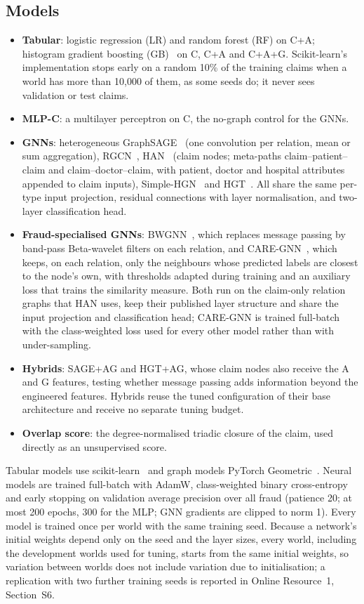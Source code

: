 \documentclass[pdflatex,sn-vancouver-num]{sn-jnl}
\newcommand{\SSecSeeds}{S6}\newcommand{\STabSeeds}{S5}
\begin{document}
\subsection{Models}\label{sec:models}
\begin{itemize}
\item \textbf{Tabular}: logistic regression (LR) and random forest (RF) on C+A;
  histogram gradient boosting (GB)~\cite{ke2017lightgbm} on C, C+A and C+A+G.
  Scikit-learn's implementation stops early on a random 10\% of the training
  claims when a world has more than 10{,}000 of them, as some seeds do; it
  never sees validation or test claims.
\item \textbf{MLP-C}: a multilayer perceptron on C, the no-graph control for the GNNs.
\item \textbf{GNNs}: heterogeneous GraphSAGE~\cite{hamilton2017sage} (one convolution
  per relation, mean or sum aggregation), RGCN~\cite{schlichtkrull2018}, HAN~\cite{wang2019han}
  (claim nodes; meta-paths claim--patient--claim and claim--doctor--claim, with
  patient, doctor and hospital attributes appended to claim inputs),
  Simple-HGN~\cite{lv2021} and HGT~\cite{hu2020hgt}. All share the same
  per-type input projection, residual connections with layer normalisation,
  and two-layer classification head.
\item \textbf{Fraud-specialised GNNs}: BWGNN~\cite{tang2022bwgnn}, which replaces
  message passing by band-pass Beta-wavelet filters on each relation, and
  CARE-GNN~\cite{dou2020care}, which keeps, on each relation, only the
  neighbours whose predicted labels are closest to the node's own, with
  thresholds adapted during training and an auxiliary loss that trains the
  similarity measure. Both run on the claim-only relation
  graphs that HAN uses, keep their published layer structure and share the
  input projection and classification head; CARE-GNN is trained full-batch
  with the class-weighted loss used for every other model rather than with
  under-sampling.
\item \textbf{Hybrids}: SAGE+AG and HGT+AG, whose claim nodes also receive the
  A and G features, testing whether message passing adds information beyond
  the engineered features. Hybrids reuse the tuned configuration of their base
  architecture and receive no separate tuning budget.
\item \textbf{Overlap score}: the degree-normalised triadic closure of the claim,
  used directly as an unsupervised score.
\end{itemize}
Tabular models use scikit-learn~\cite{pedregosa2011} and graph models PyTorch
Geometric~\cite{fey2019}. Neural models are trained full-batch with AdamW,
class-weighted binary cross-entropy and early stopping on validation average
precision over all fraud (patience 20; at most 200 epochs, 300 for the MLP;
GNN gradients are clipped to norm 1). Every model is trained once per
world with the same training seed. Because a network's initial weights depend
only on the seed and the layer sizes, every world, including the development
worlds used for tuning, starts from the same initial weights, so variation
between worlds does not include variation due to initialisation; a
replication with two further training seeds is reported in Online
Resource~1, Section~\SSecSeeds.
\end{document}
